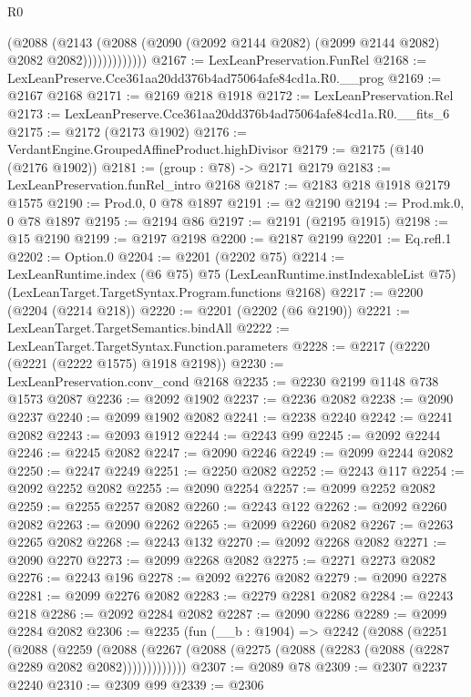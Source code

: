 \begin{lexlean}{R0}
\begin{coremodule}
                      (@2088
                        (@2143
                          (@2088
                            (@2090 (@2092 @2144 @2082) (@2099 @2144 @2082) @2082 @2082)))))))))))))
@2167 := LexLeanPreservation.FunRel
@2168 := LexLeanPreserve.Cce361aa20dd376b4ad75064afe84cd1a.R0.__prog
@2169 := @2167 @2168
@2171 := @2169 @218 @1918
@2172 := LexLeanPreservation.Rel
@2173 := LexLeanPreserve.Cce361aa20dd376b4ad75064afe84cd1a.R0.__fits_6
@2175 := @2172 (@2173 @1902)
@2176 := VerdantEngine.GroupedAffineProduct.highDivisor
@2179 := @2175 (@140 (@2176 @1902))
@2181 := (group : @78) -> @2171 @2179
@2183 := LexLeanPreservation.funRel_intro @2168
@2187 := @2183 @218 @1918 @2179 @1575
@2190 := Prod.{0, 0} @78 @1897
@2191 := @2 @2190
@2194 := Prod.mk.{0, 0} @78 @1897
@2195 := @2194 @86
@2197 := @2191 (@2195 @1915)
@2198 := @15 @2190
@2199 := @2197 @2198
@2200 := @2187 @2199
@2201 := Eq.refl.{1}
@2202 := Option.{0}
@2204 := @2201 (@2202 @75)
@2214 := LexLeanRuntime.index
    (@6 @75)
    @75
    (LexLeanRuntime.instIndexableList @75)
    (LexLeanTarget.TargetSyntax.Program.functions @2168)
@2217 := @2200 (@2204 (@2214 @218))
@2220 := @2201 (@2202 (@6 @2190))
@2221 := LexLeanTarget.TargetSemantics.bindAll
@2222 := LexLeanTarget.TargetSyntax.Function.parameters
@2228 := @2217 (@2220 (@2221 (@2222 @1575) @1918 @2198))
@2230 := LexLeanPreservation.conv_cond @2168
@2235 := @2230 @2199 @1148 @738 @1573 @2087
@2236 := @2092 @1902
@2237 := @2236 @2082
@2238 := @2090 @2237
@2240 := @2099 @1902 @2082
@2241 := @2238 @2240
@2242 := @2241 @2082
@2243 := @2093 @1912
@2244 := @2243 @99
@2245 := @2092 @2244
@2246 := @2245 @2082
@2247 := @2090 @2246
@2249 := @2099 @2244 @2082
@2250 := @2247 @2249
@2251 := @2250 @2082
@2252 := @2243 @117
@2254 := @2092 @2252 @2082
@2255 := @2090 @2254
@2257 := @2099 @2252 @2082
@2259 := @2255 @2257 @2082
@2260 := @2243 @122
@2262 := @2092 @2260 @2082
@2263 := @2090 @2262
@2265 := @2099 @2260 @2082
@2267 := @2263 @2265 @2082
@2268 := @2243 @132
@2270 := @2092 @2268 @2082
@2271 := @2090 @2270
@2273 := @2099 @2268 @2082
@2275 := @2271 @2273 @2082
@2276 := @2243 @196
@2278 := @2092 @2276 @2082
@2279 := @2090 @2278
@2281 := @2099 @2276 @2082
@2283 := @2279 @2281 @2082
@2284 := @2243 @218
@2286 := @2092 @2284 @2082
@2287 := @2090 @2286
@2289 := @2099 @2284 @2082
@2306 := @2235
    (fun (__b : @1904) =>
    @2242
      (@2088
        (@2251
          (@2088
            (@2259
              (@2088 (@2267 (@2088 (@2275 (@2088 (@2283 (@2088 (@2287 @2289 @2082 @2082)))))))))))))
@2307 := @2089 @78
@2309 := @2307 @2237 @2240
@2310 := @2309 @99
@2339 := @2306

\end{coremodule}
\end{lexlean}

